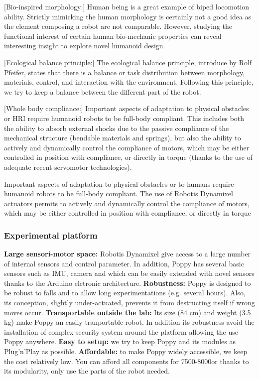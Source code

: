 [Bio-inspired morphology:] Human being is a great example of biped locomotion ability. Strictly mimicking the human morphology is certainly not a good idea as the element composing a robot are not comparable. However, studying the functional interest of certain human bio-mechanic properties can reveal interesting insight to explore novel humanoid design.

[Ecological balance principle:] The ecological balance principle, introduce by Rolf Pfeifer, states that there is a balance or task distribution between morphology, materials, control, and interaction with the environment. Following this principle, we try to keep a balance between the different part of the robot.

[Whole body compliance:] Important aspects of adaptation to physical obstacles or HRI require humanoid robots to be full-body compliant. This includes both the ability to absorb external shocks due to the passive compliance of the mechanical structure (bendable materials and springs), but also the ability to actively and dynamically control the compliance of motors, which may be either controlled in position with compliance, or directly in torque (thanks to the use of adequate recent servomotor technologies).

Important aspects of adaptation to physical obstacles or to humans require humanoid robots to be full-body compliant. The use of Robotis Dynamixel actuators permits to actively and dynamically control the compliance of motors, which may be either controlled in position with compliance, or directly in torque

\subsubsection{Experimental platform} %
\textbf{Large sensori-motor space:} Robotis Dynamixel give access to a large number of internal sensors and control parameter. In addition, Poppy has several basic sensors such as IMU, camera and which can be easily extended with novel sensors thanks to the Arduino eletronic architecture.
\textbf{Robustness:} Poppy is designed to be robust to falls and to allow long experimentations (e.g. several hours). Also, its conception, slightly under-actuated, prevents it from destructing itself if wrong moves occur.
    \textbf{Transportable outside the lab:} Its size (84 cm) and weight (3.5 kg) make Poppy an easily tranportable robot. In addition its robustness avoid the installation of complex security system around the platform allowing the use Poppy anywhere.
    \textbf{Easy to setup:} we try to keep Poppy and its modules as Plug’n'Play as possible.
    \textbf{Affordable:} to make Poppy widely accessible, we keep the cost relatively low. You can afford all components for 7500-8000\texteuro or thanks to its modularity, only use the parts of the robot needed.


